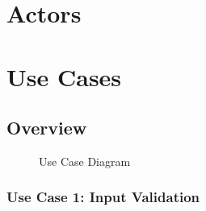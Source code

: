 \documentclass[12pt]{article}
\begin{document}
\clearpage

\section{Actors}

\clearpage

\section{Use Cases}

\subsection{Overview}

\begin{figure}[htbp]
\caption{Use Case Diagram}
\label{fig:use-case-diagram}
\end{figure}
\clearpage
\subsubsection{Use Case 1: Input Validation} \label{uc:1}
\end{document}
